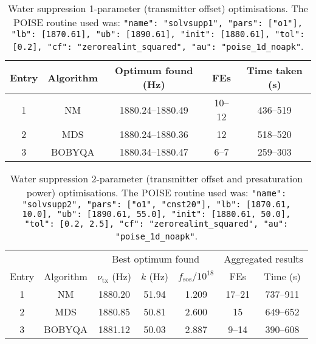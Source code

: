 \begin{table}
    \centering
    \begin{tabular}{ccccc}
        \toprule
        Entry & Algorithm & Optimum found (\si{\Hz}) & FEs    & Time taken (\si{\s}) \\
        \midrule
        1     & NM        & 1880.24--1880.49         & 10--12 & 436--519             \\
        2     & MDS       & 1880.24--1880.36         & 12     & 518--520             \\
        3     & BOBYQA    & 1880.34--1880.47         & 6--7   & 259--303             \\
        \bottomrule
    \end{tabular}
    \caption{
        Water suppression 1-parameter (transmitter offset) optimisations.
        The POISE routine used was: \texttt{{"name": "solvsupp1", "pars": ["o1"], "lb": [1870.61], "ub": [1890.61], "init": [1880.61], "tol": [0.2], "cf": "zerorealint_squared", "au": "poise_1d_noapk"}}.
    }
    \label{tbl:poise_solvsupp1p}
\end{table}

\begin{table}
    \centering
    \begin{tabular}{ccccccc}
        \toprule
              &           & \multicolumn{3}{c}{Best optimum found} & \multicolumn{2}{c}{Aggregated results} \\
                            \cmidrule(lr){3-5}                       \cmidrule(lr){6-7}
        Entry & Algorithm & $\nu_\text{tx}$ (\si{\Hz}) & $k$ (\si{\Hz}) & $f_\text{sos} / 10^{18}$ & FEs    & Time (\si{\s}) \\
        \midrule
        1     & NM        & 1880.20                    & 51.94          & 1.209                    & 17--21 & 737--911       \\
        2     & MDS       & 1880.85                    & 50.81          & 2.600                    & 15     & 649--652       \\
        3     & BOBYQA    & 1881.12                    & 50.03          & 2.887                    & 9--14  & 390--608       \\
        \bottomrule
    \end{tabular}
    \caption{
        Water suppression 2-parameter (transmitter offset and presaturation power) optimisations.
        The POISE routine used was: \texttt{{"name": "solvsupp2", "pars": ["o1", "cnst20"], "lb": [1870.61, 10.0], "ub": [1890.61, 55.0], "init": [1880.61, 50.0], "tol": [0.2, 2.5], "cf": "zerorealint_squared", "au": "poise_1d_noapk"}}.
    }
    \label{tbl:poise_solvsupp2p}
\end{table}


